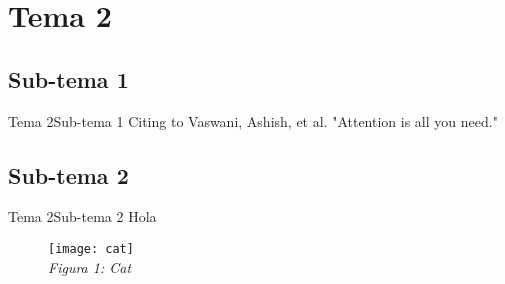 \section{Tema 2}

\subsection{Sub-tema 1}
\begin{frame}{Tema 2}{Sub-tema 1}
  Citing to Vaswani, Ashish, et al. "Attention is all you need."\cite{vaswani2017attention}
\end{frame}


\subsection{Sub-tema 2}
\begin{frame}{Tema 2}{Sub-tema 2}
  Hola
  \begin{figure}
    \texttt{[image: cat]}
    \\
    \textit{Figura 1: Cat \cite{website-mlm}}
  \end{figure}
\end{frame}

